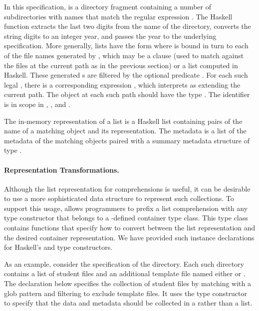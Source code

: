 In this specification,  is a directory fragment containing a number of
 subdirectories with names  that match the regular expression
.  The Haskell function  extracts the last two digits from the
name of the directory, converts the string digits to an integer year, and passes
the year to the underlying  specification.
More generally, \forest{} lists have the form  where  
is bound in turn to each of the file names generated by , which may be a  clause 
(used to match against the files at the current path as in the previous section) or a list
computed in Haskell.  These generated s are filtered by the
optional predicate .  For each such legal , there is a
corresponding expression , which \forest{} interprets as extending
the current path.  The object at each such path should have the \forest{}
type .  The identifier  is in scope in ,
, and .  

The in-memory representation of a \forest{} list is a Haskell list containing
pairs of the name of a matching object and its representation.  The
metadata is a list of the metadata of the matching objects paired with
a summary metadata structure of type .


\paragraph*{Representation Transformations.}
Although the list representation for comprehensions is useful, it can
be desirable to use a more sophisticated data structure to
represent such collections.  To support
this usage, \forest{} allows programmers to prefix a list
comprehension with any type constructor that belongs to a
\forest{}-defined 
container type class.  This type class contains functions that
specify how to convert between the list representation and the
desired container representation.  We have provided such instance
declarations for Haskell's  and  type constructors.

As an example, consider the specification of the  directory.
Each such directory contains a list of student files and an additional
template file named either  or .  The
declaration below specifies the collection of student files by
matching with a glob pattern and filtering to exclude 
template files. It uses the  type constructor to specify that
the data and metadata should be collected in a
 rather than a list.  

